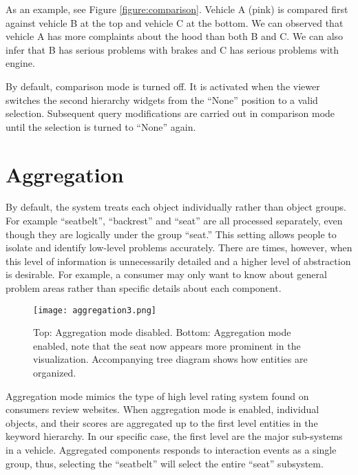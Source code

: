 As an example, see Figure \ref{figure:comparison}. Vehicle A (pink) is compared
first against vehicle B at the top and vehicle C at the bottom. We can observed
that vehicle A has more complaints about the hood than both B and C. We can also
infer that B has serious problems with brakes and C has serious problems with
engine.
 
By default, comparison mode is turned off. It is activated when the viewer
switches the second hierarchy widgets from the ``None'' position to a valid
selection. Subsequent query modifications are carried out in comparison mode
until the selection is turned to ``None'' again.


 
 
 
\section{Aggregation}
By default, the system treats each object individually rather than object
groups. For example ``seatbelt'', ``backrest'' and ``seat'' are all processed
separately, even though they are logically under the group ``seat.'' This
setting allows people to isolate and identify low-level problems accurately. There
are times, however, when this level of information is unnecessarily detailed and
a higher level of abstraction is desirable. For example, a consumer may only
want to know about general problem areas rather than specific details about each
component.

	\begin{figure}
	 \centering  
	 \texttt{[image: aggregation3.png]}
	 \caption[Aggregation View]{Top: Aggregation mode disabled. Bottom: Aggregation
	 mode enabled, note that the seat now appears more prominent in the
	 visualization. Accompanying tree diagram shows how entities are organized.}
	 \label{figure:aggregation}
	\end{figure}
	
Aggregation mode mimics the type of high level rating system found on consumers
review websites. When aggregation mode is enabled, individual objects, and their
scores are aggregated up to the first level entities in the keyword hierarchy. In our specific case, the 
first level are the major sub-systems in a vehicle. Aggregated components
responds to interaction events as a single group, thus, selecting the
``seatbelt'' will select the entire ``seat'' subsystem.


